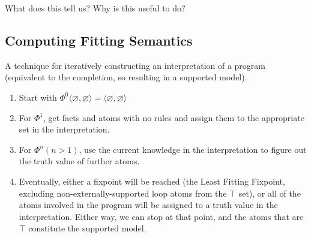\documentclass[9pt,a4paper,landscape]{article}
\begin{document}
{\begin{center}
\begin{tabular}{p{3cm}p{5cm}p{6cm}}
	\end{tabular}
\end{center}

What does this tell us? Why is this useful to do?

\pagebreak


\subsection{Computing Fitting Semantics}
\label{subsec:fitting-sem}

A technique for iteratively constructing an interpretation of a program (equivalent to the completion, so resulting in a supported model).

\begin{enumerate}[noitemsep]
	\item Start with $\Phi^0 \langle \varnothing, \varnothing \rangle = \langle \varnothing, \varnothing \rangle$
	\item For $\Phi^1$, get facts and atoms with no rules and assign them to the appropriate set in the interpretation.
	\item For  $\Phi^n (n>1)$, use the current knowledge in the interpretation to figure out the truth value of further atoms.
	\item Eventually, either a fixpoint will be reached (the Least Fitting Fixpoint, excluding non-externally-supported loop atoms from the $\top$ set), or all of the atoms involved in the program will be assigned to a truth value in the interpretation. Either way, we can stop at that point, and the atoms that are $\top$ constitute the supported model.
\end{enumerate}

}
\end{document}
